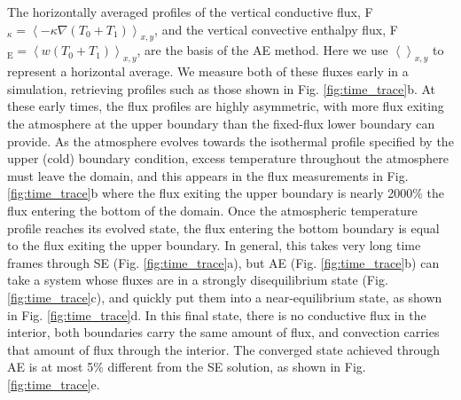 \documentclass[aps, pre, onecolumn, nofootinbib, notitlepage, groupedaddress, amsfonts, amssymb, amsmath, longbibliography]{revtex4-1}
\newcommand{\angles}[1]{\ensuremath{\left\langle #1 \right\rangle}}
\newcommand{\grad}{\ensuremath{\nabla}}
\begin{document}
The horizontally averaged profiles of the vertical conductive flux, 
F$_{\kappa} = \angles{-\kappa\grad(T_0 + T_1)}_{x,y}$, and the vertical convective enthalpy flux,
F$_{\text{E}} = \angles{w(T_0 + T_1)}_{x,y}$, are the basis of the AE method.
Here we use $\angles{}_{x,y}$ to represent a horizontal average. We measure
both of these fluxes early in a simulation, retrieving profiles such as
those shown in Fig. \ref{fig:time_trace}b.
At these early times, the flux profiles are highly asymmetric,
with more flux exiting the atmosphere at the upper boundary than 
the fixed-flux lower boundary can provide. As the atmosphere evolves towards
the isothermal profile specified by the upper (cold) boundary condition, excess
temperature throughout the atmosphere must leave the domain, and this appears in
the flux measurements in Fig. \ref{fig:time_trace}b where the flux exiting the upper
boundary is nearly 2000\% the flux entering the bottom of the domain. Once the atmospheric
temperature profile reaches its evolved state, the flux entering the bottom boundary
is equal to the flux exiting the upper boundary.  In general, this takes very long time
frames through SE (Fig. \ref{fig:time_trace}a), but AE (Fig. \ref{fig:time_trace}b)
can take a system whose fluxes are in a strongly disequilibrium state (Fig. \ref{fig:time_trace}c),
and quickly put them into a near-equilibrium state, as shown in Fig. \ref{fig:time_trace}d. In
this final state, there is no conductive flux in the interior, both boundaries carry the
same amount of flux, and convection carries that amount of flux through the interior.
The converged state achieved through AE is at most 5\% different from the SE solution, as shown in
Fig. \ref{fig:time_trace}e. 
\end{document}
